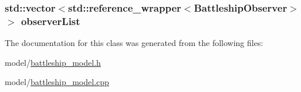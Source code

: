 \subsubsection[{\texorpdfstring{observer\+List}{observerList}}]{\setlength{\rightskip}{0pt plus 5cm}std\+::vector$<$std\+::reference\+\_\+wrapper$<${\bf Battleship\+Observer}$>$ $>$ observer\+List\hspace{0.3cm}{\ttfamily [private]}}\hypertarget{classMODEL_1_1BattleshipModel_aa59628064f9d6059844ecaec72b885d2}{}\label{classMODEL_1_1BattleshipModel_aa59628064f9d6059844ecaec72b885d2}


The documentation for this class was generated from the following files\+:\begin{DoxyCompactItemize}
\item 
model/\hyperlink{battleship__model_8h}{battleship\+\_\+model.\+h}\item 
model/\hyperlink{battleship__model_8cpp}{battleship\+\_\+model.\+cpp}\end{DoxyCompactItemize}

